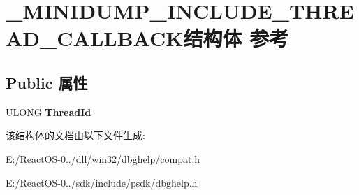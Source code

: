 \hypertarget{struct___m_i_n_i_d_u_m_p___i_n_c_l_u_d_e___t_h_r_e_a_d___c_a_l_l_b_a_c_k}{}\section{\+\_\+\+M\+I\+N\+I\+D\+U\+M\+P\+\_\+\+I\+N\+C\+L\+U\+D\+E\+\_\+\+T\+H\+R\+E\+A\+D\+\_\+\+C\+A\+L\+L\+B\+A\+C\+K结构体 参考}
\label{struct___m_i_n_i_d_u_m_p___i_n_c_l_u_d_e___t_h_r_e_a_d___c_a_l_l_b_a_c_k}
\subsection*{Public 属性}
\begin{DoxyCompactItemize}
\item 
\mbox{\label{struct___m_i_n_i_d_u_m_p___i_n_c_l_u_d_e___t_h_r_e_a_d___c_a_l_l_b_a_c_k_a97e36391420f4a5825cc72f88278b303}} 
U\+L\+O\+NG {\bfseries Thread\+Id}
\end{DoxyCompactItemize}


该结构体的文档由以下文件生成\+:\begin{DoxyCompactItemize}
\item 
E\+:/\+React\+O\+S-\/0../dll/win32/dbghelp/compat.\+h\item 
E\+:/\+React\+O\+S-\/0../sdk/include/psdk/dbghelp.\+h\end{DoxyCompactItemize}
